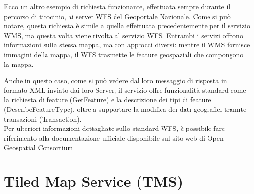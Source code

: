 \lstset{basicstyle=\footnotesize\ttfamily}

Ecco un altro esempio di richiesta funzionante, effettuata sempre durante il percorso di tirocinio, ai server WFS del Geoportale Nazionale.
Come si può notare, questa richiesta è simile a quella effettuata precedentemente per il servizio WMS, ma questa volta viene rivolta al servizio WFS. Entrambi i servizi offrono informazioni sulla stessa mappa, ma con approcci diversi: mentre il WMS fornisce immagini della mappa, il WFS trasmette le feature geospaziali che compongono la mappa.

\lstset{basicstyle=\footnotesize\ttfamily}

Anche in questo caso, come si può vedere dal loro messaggio di risposta \cite{GetCapabilitiesWFS} in formato XML inviato dai loro Server,
il servizio offre funzionalità standard come la richiesta di feature (GetFeature) e la descrizione dei tipi di feature (DescribeFeatureType), oltre a supportare la modifica dei dati geografici tramite transazioni (Transaction).
\\Per ulteriori informazioni dettagliate sullo standard WFS, è possibile fare riferimento alla documentazione ufficiale disponibile sul sito web di Open Geospatial Consortium \cite{DocumentazioneWFS}

\section{Tiled Map Service (TMS)}

